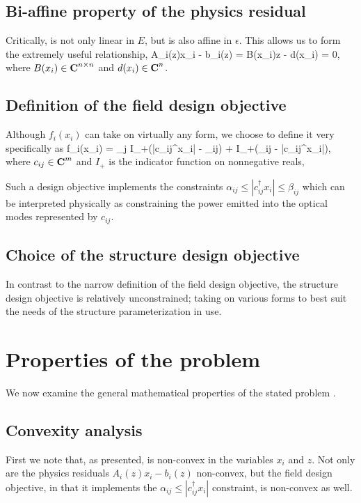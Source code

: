\documentclass{book}
\newcommand{\T}{^\dagger}
\newcommand{\comps}{{\mbox{\bf C}}}
\begin{document}
\subsection{Bi-affine property of the physics residual}
Critically,  is not only linear in $E$,
    but is also affine in $\epsilon$.
This allows us to form the extremely useful relationship,
        {A_i(z)x_i - b_i(z) = B(x_i)z - d(x_i) = 0,}
    where $B(x_i) \in \comps^{n \times n}$ and $d(x_i) \in \comps^n$.
    

\subsection{Definition of the field design objective}
Although $f_i(x_i)$ can take on virtually any form,
    we choose to define it very specifically as
        {f_i(x_i) = \sum_j I_+(|c_{ij}\T x_i| - \alpha_{ij})
            + I_+(\beta_{ij} - |c_{ij}\T x_i|),}
    where $c_{ij} \in \comps^m$ and 
    $I_+$ is the indicator function on nonnegative reals,

Such a design objective implements the constraints 
    $\alpha_{ij} \le |c_{ij}\T x_i| \le \beta_{ij}$
    which can be interpreted physically as 
    constraining the power emitted into the optical modes
    represented by $c_{ij}$.

\subsection{Choice of the structure design objective}
In contrast to the narrow definition of the field design objective,
    the structure design objective is relatively unconstrained;
    taking on various forms to best suit the needs of
    the structure parameterization in use.

\section{Properties of the problem}
We now examine the general mathematical properties 
    of the stated problem .

\subsection{Convexity analysis}
First we note that, as presented, 
     is non-convex 
    in the variables $x_i$ and $z$. %
Not only are the physics residuals $A_i(z)x_i - b_i(z)$ non-convex,
    but the field design objective, in that it implements the 
    $ \alpha_{ij} \le |c_{ij}\T x_i| $ constraint, is non-convex as well.
\end{document}
